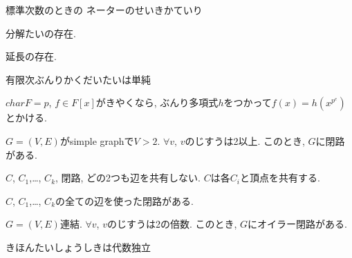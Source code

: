 \begin{prop}
標準次数のときの
  ネーターのせいきかていり
\end{prop}

\begin{prop}
  分解たいの存在.
\end{prop}

\begin{prop}
  延長の存在.
\end{prop}

\begin{prop}
  有限次ぶんりかくだいたいは単純
\end{prop}

\begin{prop}
  $char F=p$, $f\in F[x]$がきやくなら,
  ぶんり多項式$h$をつかって$f(x)=h(x^{p^e})$とかける.
\end{prop}



\begin{prop}
  $G=(V,E)$がsimple graphで$V>2$.
  $\forall v$, $v$のじすうは2以上.
  このとき, $G$に閉路がある.
\end{prop}

\begin{prop}
  $C$, $C_1$,\ldots, $C_k$, 閉路, どの2つも辺を共有しない.
  $C$は各$C_i$と頂点を共有する.

  $C$, $C_1$,\ldots, $C_k$の全ての辺を使った閉路がある.
\end{prop}


\begin{prop}
  $G=(V,E)$連結.
  $\forall v$, $v$のじすうは2の倍数.
  このとき, $G$にオイラー閉路がある.
\end{prop}



\begin{prop}
きほんたいしょうしきは代数独立
\end{prop}
